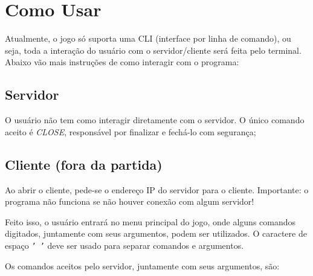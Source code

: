 \documentclass{article}
\begin{document}
\section{Como Usar}
    Atualmente, o jogo só suporta uma CLI (interface por linha de comando), ou seja, toda a interação do usuário com o servidor/cliente será feita pelo terminal. Abaixo vão mais instruções de como interagir com o programa:
    \subsection{Servidor}
        O usuário não tem como interagir diretamente com o servidor. O único comando aceito é \emph{CLOSE}, responsável por finalizar e fechá-lo com segurança;
    \subsection{Cliente (fora da partida)}
        Ao abrir o cliente, pede-se o endereço IP do servidor para o cliente. Importante: o programa não funciona se não houver conexão com algum servidor! \par
        Feito isso, o usuário entrará no menu principal do jogo, onde alguns comandos digitados, juntamente com seus argumentos, podem ser utilizados. O caractere de espaço \texttt{' '} deve ser usado para separar comandos e argumentos. \par
        Os comandos aceitos pelo servidor, juntamente com seus argumentos, são:
\end{document}
